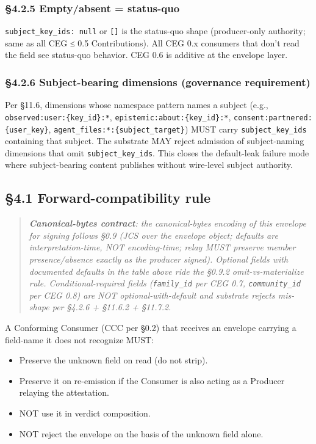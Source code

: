 \documentclass[10pt]{article}
\begin{document}
\subsubsection*{§4.2.5 Empty/absent = status-quo}


\texttt{subject\_key\_ids: null} or \texttt{[]} is the status-quo shape (producer-only authority; same as all CEG ≤ 0.5 Contributions). All CEG 0.x consumers that don't read the field see status-quo behavior. CEG 0.6 is additive at the envelope layer.


\subsubsection*{§4.2.6 Subject-bearing dimensions (governance requirement)}


Per §11.6, dimensions whose namespace pattern names a subject (e.g., \texttt{observed:user:\{key\_id\}:*}, \texttt{epistemic:about:\{key\_id\}:*}, \texttt{consent:partnered:\{user\_key\}}, \texttt{agent\_files:*:\{subject\_target\}}) MUST carry \texttt{subject\_key\_ids} containing that subject. The substrate MAY reject admission of subject-naming dimensions that omit \texttt{subject\_key\_ids}. This closes the default-leak failure mode where subject-bearing content publishes without wire-level subject authority.


\subsection*{§4.1 Forward-compatibility rule}


\begin{quote}\itshape \textbf{Canonical-bytes contract}: the canonical-bytes encoding of this envelope for signing follows §0.9 (JCS over the envelope object; defaults are interpretation-time, NOT encoding-time; relay MUST preserve member presence/absence exactly as the producer signed). Optional fields with documented defaults in the table above ride the §0.9.2 omit-vs-materialize rule. Conditional-required fields (\texttt{family\_id} per CEG 0.7, \texttt{community\_id} per CEG 0.8) are NOT optional-with-default and substrate rejects mis-shape per §4.2.6 + §11.6.2 + §11.7.2.\end{quote}




A Conforming Consumer (CCC per §0.2) that receives an envelope carrying a field-name it does not recognize MUST:


\begin{itemize}\setlength\itemsep{0pt}
\item Preserve the unknown field on read (do not strip).
\item Preserve it on re-emission if the Consumer is also acting as a Producer relaying the attestation.
\item NOT use it in verdict composition.
\item NOT reject the envelope on the basis of the unknown field alone.
\end{itemize}
\end{document}

